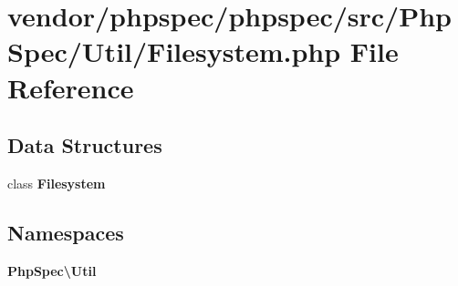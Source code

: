 \section{vendor/phpspec/phpspec/src/\+Php\+Spec/\+Util/\+Filesystem.php File Reference}
\label{phpspec_2phpspec_2src_2_php_spec_2_util_2_filesystem_8php}
\subsection*{Data Structures}
\begin{DoxyCompactItemize}
\item 
class {\bf Filesystem}
\end{DoxyCompactItemize}
\subsection*{Namespaces}
\begin{DoxyCompactItemize}
\item 
 {\bf Php\+Spec\textbackslash{}\+Util}
\end{DoxyCompactItemize}
